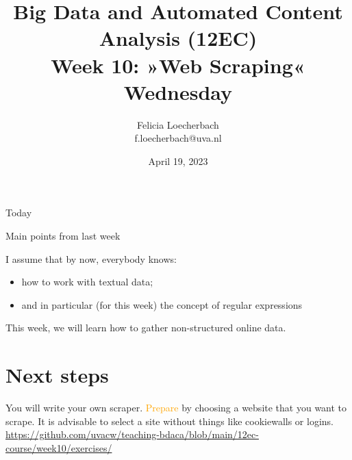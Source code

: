 \documentclass[compress]{beamer}
\begin{document}
\title[Big Data and Automated Content Analysis]{\textbf{Big Data and Automated Content Analysis (12EC)} 
\\Week 10: »Web Scraping«
\\Wednesday}
\author[Felicia Loecherbach]{Felicia Loecherbach\\ \footnotesize{f.loecherbach@uva.nl \\}}
\date{April 19, 2023}


\begin{frame}{}
	\titlepage
\end{frame}

\begin{frame}{Today}
	\tableofcontents
\end{frame}





\begin{frame}{Main points from last week}

\begin{alertblock}{I assume that by now, everybody knows:}
\begin{itemize}
\item how to work with textual data;
\item and in particular (for this week) the concept of regular expressions
\end{itemize}
\end{alertblock}
\end{frame}


\begin{frame}[standout]
This week, we will learn how to gather non-structured online data.
\end{frame}














\section{Next steps}

\begin{frame}[standout]
You will write your own scraper. \textcolor{orange}{Prepare} by choosing a website that you want to scrape. It is advisable to select a site without things like cookiewalls or logins.
\large{\url{https://github.com/uvacw/teaching-bdaca/blob/main/12ec-course/week10/exercises/}}
\end{frame}





\begin{frame}
	\printbibliography
\end{frame}
\end{document}
